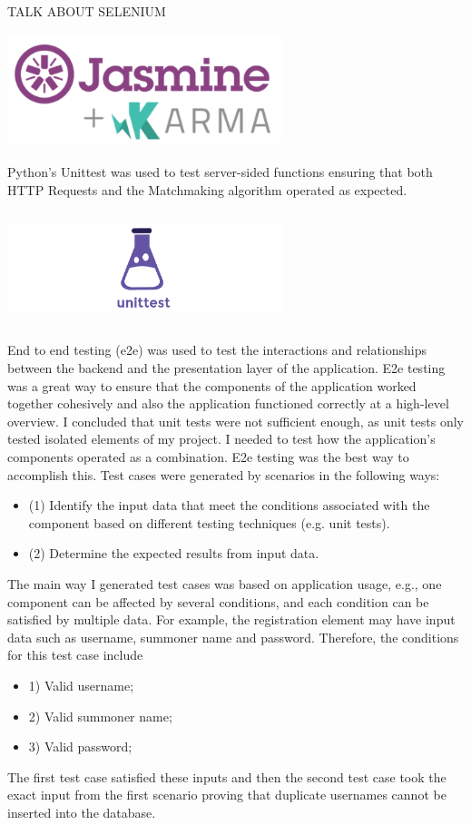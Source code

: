 TALK ABOUT SELENIUM
\begin{center}    
	\includegraphics[width=8cm,height=3.3cm,keepaspectratio]{img/Jasmine_and_Karma.png}
\end{center}
Python’s Unittest was used to test server-sided functions ensuring that both HTTP Requests and the Matchmaking algorithm operated as expected.
\begin{center}    
	\includegraphics[width=8cm,height=3.3cm,keepaspectratio]{img/Unittest.png}
\end{center}
End to end testing (e2e) was used to test the interactions and relationships between the backend and the presentation layer of the application. E2e testing was a great way to ensure that the components of the application worked together cohesively and also the application functioned correctly at a high-level overview. I concluded that unit tests were not sufficient enough, as unit tests only tested isolated elements of my project. I needed to test how the application's components operated as a combination. E2e testing was the best way to accomplish this.
Test cases were generated by scenarios in the following ways:~\cite{bai2001distributed}
\begin{itemize}
	\item (1) Identify the input data that meet the conditions associated with the component based on different testing techniques (e.g. unit tests).
	\item (2) Determine the expected results from input data. 
\end{itemize}
The main way I generated test cases was based on application usage, e.g., one component can be affected by several conditions, and each condition can be satisfied by multiple data. For example, the registration element may have input data such as username, summoner name and password. Therefore, the conditions for this test case include
\begin{itemize}
	\item 1) Valid username; 
	\item 2) Valid summoner name; 
	\item 3) Valid password;
\end{itemize}
The first test case satisfied these inputs and then the second test case took the exact input from the first scenario proving that duplicate usernames cannot be inserted into the database.

